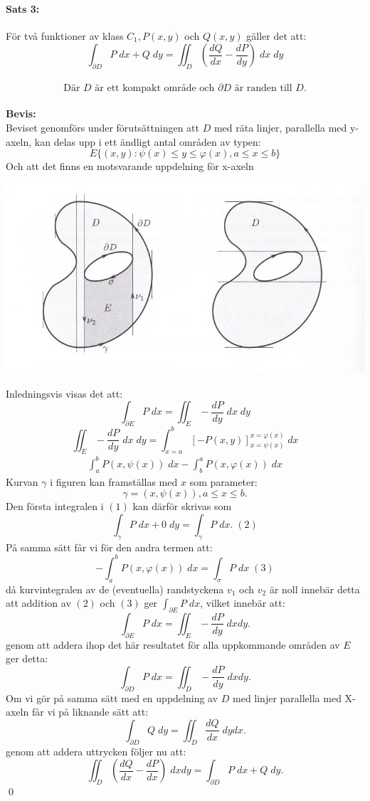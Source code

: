 \documentclass{article}%
\begin{document}
\paragraph{Sats 3:} För två funktioner av klass $C_1, P(x, y)$ och $Q(x, y)$ gäller det att:
$$\int_{\partial D} P\; dx + Q \; dy = \iint_D \left ( \frac {d Q} {d x} - \frac {d P} {d y}
	\right ) \; dx \; dy$$\\
$$\text{Där $D$ är ett kompakt område och $\partial D$ är randen till $D$.}$$
\\
{\bf Bevis:} \\
Beviset genomförs under förutsättningen att $D$ med räta linjer, parallella med y-axeln, kan delas upp i ett 
ändligt antal områden av typen:
$$E \{ (x, y): \psi(x) \le y \le \varphi(x), a \le x \le b \}$$
Och att det finns en motsvarande uppdelning för x-axeln
\begin{center}
	\includegraphics[scale=0.5]{linus_0001.jpg}
\end{center}
Inledningsvis visas det att:
$$\int_{\partial E} P \; dx = \iint_E - \frac {dP} {dy} \; dx \; dy$$
$$\iint_E - \frac {dP} {dy} \; dx \; dy = \int^b_{x=a} \left [ -P (x, y) \right ]^{x = \varphi(x)}_{x= \psi(x)} \; dx$$
\begin{align}
	\int_a^bP(x, \psi(x)) \; dx - \int_b^aP(x, \varphi(x)) \; dx
\end{align}
Kurvan $\gamma$ i figuren kan framställas med $x$ som parameter:
$$\gamma = (x, \psi(x)), a\le x \le b.$$
Den första integralen i $(1)$ kan därför skrivas som 
$$\int_{\gamma} P \; dx + 0 \; dy = \int_{\gamma} P \; dx. \; (2)$$
På samma sätt får vi för den andra termen att:
$$- \int_a^b P(x, \varphi(x)) \; dx = \int_{\sigma} P \; dx \; (3)$$ %
då kurvintegralen av de (eventuella) randstyckena $v_1$ och $v_2$ är noll innebär detta att
addition av $(2)$ och $(3)$ ger $\int_{\partial E} P \; dx$, vilket
innebär att:
$$\int_{\partial E} P \; dx = \iint_E - \frac {dP} {dy} \; dx dy.$$
genom att addera ihop det här resultatet för alla uppkommande områden av $E$ ger detta:
$$\int_{\partial D} P \; dx = \iint_D - \frac {dP} {dy} \; dx dy.$$
Om vi gör på samma sätt med en uppdelning av $D$ med linjer parallella med X-axeln får vi på liknande sätt att:
$$\int_{\partial D} Q \; dy = \iint_D \frac {dQ} {dx} \; dy dx.$$ 
genom att addera uttrycken följer nu att:
$$\iint_D \left ( \frac {dQ} {dx} - \frac {dP} {dx} \right ) \; dx dy = \int_{\partial D} P \; dx + Q \; dy.$$
\hfill \qed
\end{document}
